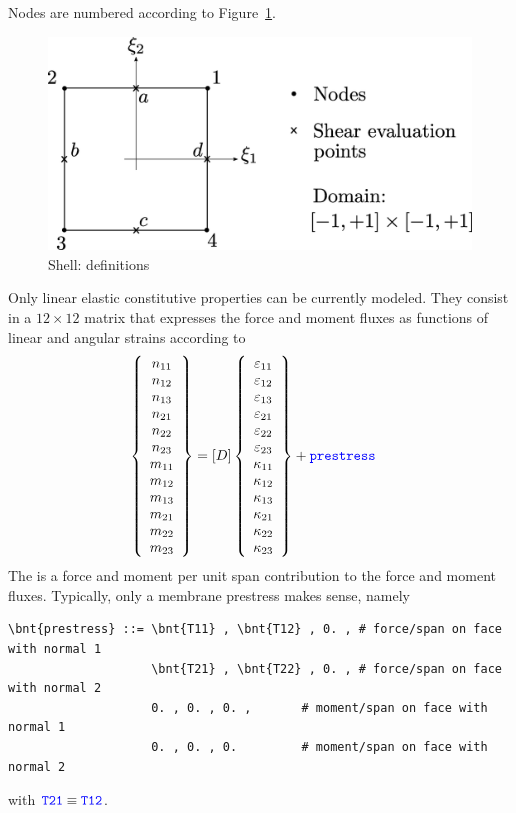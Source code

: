Nodes are numbered according to Figure~\ref{fig:EL:PLATE:SHELL4:sketch}.
\begin{figure}
\centering
\includegraphics[width=.6\textwidth]{shellPic}
\caption{Shell: definitions}
\label{fig:EL:PLATE:SHELL4:sketch}
\end{figure}

Only linear elastic constitutive properties can be currently modeled.
They consist in a $12 \times 12$ matrix that expresses the force and moment
fluxes as functions of linear and angular strains according to
\begin{align}
	\left\{ \begin{array}{c} 
		n_{11} \\
		n_{12} \\
		n_{13} \\
		n_{21} \\
		n_{22} \\
		n_{23} \\
		m_{11} \\
		m_{12} \\
		m_{13} \\
		m_{21} \\
		m_{22} \\
		m_{23}
	 \end{array} \right\}
	&=
	\left[ D \right]
	\left\{ \begin{array}{c} 
		\varepsilon_{11} \\
		\varepsilon_{12} \\
		\varepsilon_{13} \\
		\varepsilon_{21} \\
		\varepsilon_{22} \\
		\varepsilon_{23} \\
		\kappa_{11} \\
		\kappa_{12} \\
		\kappa_{13} \\
		\kappa_{21} \\
		\kappa_{22} \\
		\kappa_{23}
	 \end{array} \right\}
	+
	\textcolor{blue}{\texttt{prestress}}
\end{align}
The  is a force and moment per unit span contribution
to the force and moment fluxes.
Typically, only a membrane prestress makes sense, namely
\begin{Verbatim}[commandchars=\\\{\}]
    \bnt{prestress} ::= \bnt{T11} , \bnt{T12} , 0. , # force/span on face with normal 1
                    \bnt{T21} , \bnt{T22} , 0. , # force/span on face with normal 2
                    0. , 0. , 0. ,       # moment/span on face with normal 1
                    0. , 0. , 0.         # moment/span on face with normal 2
\end{Verbatim}
with $\textcolor{blue}{\texttt{T21}} \equiv \textcolor{blue}{\texttt{T12}}$.


